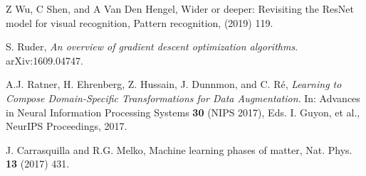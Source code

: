 \documentclass[aps,prl,amssymb,amsmath,twocolumn,floatfix]{revtex4}
\begin{document}
\begin{thebibliography}{99}
 Z Wu, C Shen, and A Van Den Hengel, Wider or deeper: Revisiting the ResNet model for visual recognition, Pattern recognition, {\bf} (2019) 119.

 S. Ruder, {\em An overview of gradient descent optimization algorithms}. arXiv:1609.04747.
 
  A.J. Ratner, H. Ehrenberg, Z. Hussain, J. Dunnmon, and C. R\'e, {\em Learning to Compose Domain-Specific Transformations for Data Augmentation}. In:  Advances in Neural Information Processing Systems {\bf 30} (NIPS 2017), Eds. I. Guyon, et al., NeurIPS Proceedings, 2017.
 
 J. Carrasquilla and R.G. Melko, Machine learning phases of matter, Nat. Phys. {\bf 13} (2017) 431.
  
  
\end{thebibliography}
\end{document}
